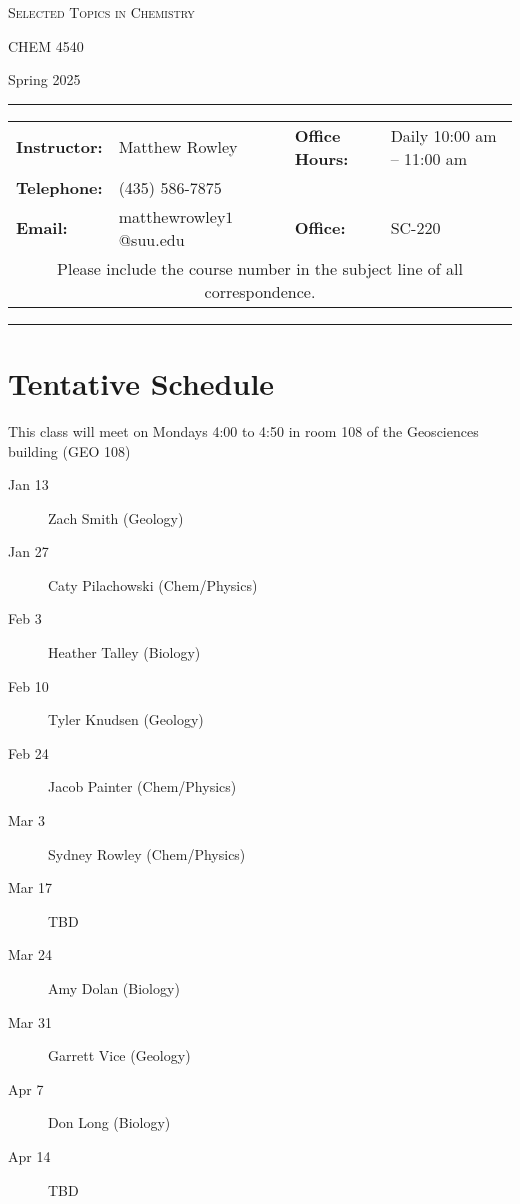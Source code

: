 \documentclass[12pt, letterpaper]{article}
\begin{document}
\begin{center}
{\Large \textsc{Selected Topics in Chemistry}}

CHEM 4540
\end{center}

\begin{center}
	{\large Spring 2025}
\end{center}
\begin{center}
	\rule{0.99\textwidth}{0.4pt}
	\begin{tabular}{llcll}
		\textbf{Instructor:} & Matthew Rowley           &  & \textbf{Office Hours:} & Daily 10:00 am -- 11:00 am \\
		\textbf{Telephone:}  & (435) 586-7875           &  &                        &  \\
		\textbf{Email:}      & matthewrowley$1$@suu.edu &  & \textbf{Office:}       & SC-220                   \\
		\multicolumn{5}{c}{Please include the course number in the subject line of all correspondence.}
	\end{tabular}
	\rule{0.99\textwidth}{0.4pt}
\end{center}

\section*{Tentative Schedule}
This class will meet on Mondays 4:00 to 4:50 in room 108 of the Geosciences building (GEO 108)

\begin{description}
  \item[Jan 13] Zach Smith (Geology)
  \item[Jan 27] Caty Pilachowski (Chem/Physics)
  \item[Feb 3] Heather Talley (Biology)
  \item[Feb 10] Tyler Knudsen (Geology)
  \item[Feb 24] Jacob Painter (Chem/Physics)
  \item[Mar 3] Sydney Rowley (Chem/Physics)
  \item[Mar 17] TBD
  \item[Mar 24] Amy Dolan (Biology)
  \item[Mar 31] Garrett Vice (Geology)
  \item[Apr 7] Don Long (Biology)
  \item[Apr 14] TBD
\end{description}
\end{document}

